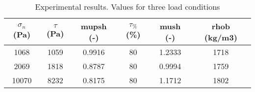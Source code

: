 \begin{table}[h]
\centering
\begin{tabular}{cccccc}
\hline
$\sigma_n$ (Pa) & $\tau$ (Pa) & \ac{mupsh} (-) & $\tau_{\%}$ (\%) &
\ac{mush} (-) & \ac{rhob} (kg/m3) \\
\hline
    1068  & 1059  & 0.9916 & 80 & 1.2333 & 1718 \\
    2069  & 1818  & 0.8787 & 80 & 0.9994 & 1759 \\
    10070 & 8232  & 0.8175 & 80 & 1.1712 & 1802 \\

\hline
\end{tabular}
\caption[Experimental results]{Experimental results. Values for three
load conditions}
\label{tab:05sinterTableExperimental}
\end{table}